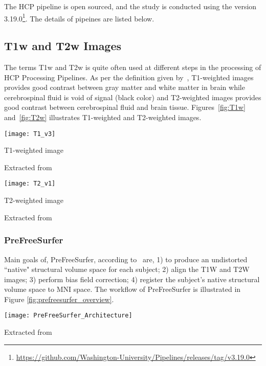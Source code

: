 The HCP pipeline is open sourced, and the study is conducted using the version 3.19.0\footnote{\url{https://github.com/Washington-University/Pipelines/releases/tag/v3.19.0}}. The details of pipeines are listed below.

\subsection{T1w and T2w Images}
The terms T1w and T2w is quite often used at different steps in the processing of HCP Processing Pipelines. As per the definition given by~\cite{t1w_t2w}, T1-weighted images provides good contrast between gray matter and white matter in brain while cerebrospinal fluid is void of signal (black color) and T2-weighted images provides good contrast between cerebrospinal fluid and brain tissue. Figures~\ref{fig:T1w} and~\ref{fig:T2w} illustrates T1-weighted and T2-weighted images.\\

\begin{center}
  \texttt{[image: T1\_v3]}
  \caption{T1-weighted image}
  \label{fig:T1w}
  \caption*{Extracted from \cite{t1w_t2w}}
\end{center}

\begin{center}
  \texttt{[image: T2\_v1]}
  \caption{T2-weighted image}
  \label{fig:T2w}
  \caption*{Extracted from \cite{t1w_t2w}}
\end{center}


\subsubsection{PreFreeSurfer}
Main goals of, PreFreeSurfer, according to~\cite{Gla13} are, 1) to produce an undistorted ``native" structural volume space for each subject; 2) align the T1W and T2W images; 3) perform bias field correction; 4) register the subject's native structural volume space to MNI space. The workflow of PreFreeSurfer is illustrated in Figure \ref{fig:prefreesurfer_overview}.

\begin{center}
  \texttt{[image: PreFreeSurfer\_Architecture]}
  \label{fig:prefreesurfer_overview}
  \caption*{Extracted from \cite{Gla13}}
\end{center}

